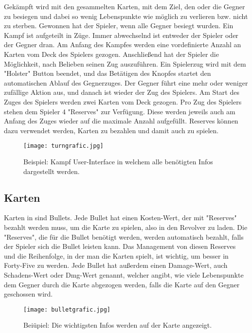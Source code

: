 Gekämpft wird mit den gesammelten Karten, mit dem Ziel, den oder die Gegner zu besiegen und dabei so wenig Lebenspunkte
wie möglich zu verlieren bzw. nicht zu sterben. Gewonnen hat der Spieler, wenn alle Gegner besiegt wurden.
Ein Kampf ist aufgeteilt in Züge. Immer abwechselnd ist entweder der Spieler oder der Gegner dran. Am Anfang des Kampfes
werden eine vordefinierte Anzahl an Karten vom Deck des Spielers gezogen.
Anschließend hat der Spieler die Möglichkeit, nach Belieben seinen Zug auszuführen. Ein Spielerzug wird mit dem "Holster"
Button beendet, und das Betätigen des Knopfes startet den automatischen Ablauf des Gegnerzuges. Der Gegner führt eine mehr
oder weniger zufällige Aktion aus, und danach ist wieder der Zug des Spielers.
Am Start des Zuges des Spielers werden zwei Karten vom Deck gezogen. Pro Zug des Spielers stehen dem Spieler 4 "Reserves"
zur Verfügung. Diese werden jeweils auch am Anfang des Zuges wieder auf die maximale Anzahl aufgefüllt.
Reserves können dazu verwendet werden, Karten zu bezahlen und damit auch zu spielen.

\begin{figure}[H]
    \texttt{[image: turngrafic.jpg]}
    \caption{Beispiel: Kampf User-Interface in welchem alle benötigten Infos dargestellt werden.}
\end{figure}



\subsection{Karten}\label{Karten}
Karten in \FF sind Bullets. Jede Bullet hat einen Kosten-Wert, der mit "Reserves" bezahlt werden muss, um die Karte zu spielen, also in den Revolver zu laden.
Die "Reserves", die für die Bullet benötigt werden, werden automatisch bezahlt, falls der Spieler sich die Bullet leisten kann.
Das Management von diesen Reserves und die Reihenfolge, in der man die Karten spielt, ist wichtig, um besser in Forty-Five zu werden.
Jede Bullet hat außerdem einen Damage-Wert, auch Schadens-Wert oder Dmg-Wert genannt, welcher angibt, wie viele Lebenspunkte dem Gegner durch die Karte abgezogen werden,
falls die Karte auf den Gegner geschossen wird.

\begin{figure}[H]
    \texttt{[image: bulletgrafic.jpg]}
    \caption{Beiüpiel: Die wichtigsten Infos werden auf der Karte angezeigt.}
\end{figure}

